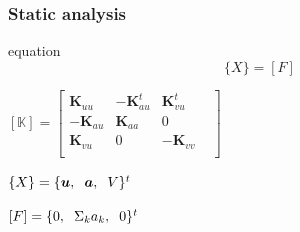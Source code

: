 \documentclass[compress]{beamer}
\begin{document}
\begin{frame}
\begin{columns}[totalwidth=\textwidth]
\begin{column}{.75\textwidth}
	\end{column}
\end{columns}	
\end{frame}

\begin{frame}\frametitle{Static analysis}
\begin{beamercolorbox}[center]{equation}
      \begin{equation*}
		[\mathbb{K}] \{ X \}=[F]
		\end{equation*}
\end{beamercolorbox}
\begin{itemize} [label=$\bullet$, font=\small, leftmargin=*]
\begin{minipage}{0.53\linewidth}
\item  $ 
[\mathbb{K}] = \begin{bmatrix}
       \boldsymbol{K}_{uu}  & -\boldsymbol{K}^t_{au} & \boldsymbol{K}^t_{vu}          \\[0.3em]
       -\boldsymbol{K}_{au} & \boldsymbol{K}_{aa}           & 0 \\[0.3em]
       \boldsymbol{K}_{vu}         & 0 & -\boldsymbol{K}_{vv} &  \\
     \end{bmatrix}
$
\end{minipage}
\begin{minipage}{0.4\linewidth}
\item $\{ X \} = \{\boldsymbol{u},\hspace{0.2cm} \boldsymbol{a},\hspace{0.2cm} V \}^t$
\item $[F] = \{0, \hspace{0.2cm} \Sigma_k a_k, \hspace{0.2cm} 0 \}^t$
\end{minipage}
\end{itemize}
\begin{columns}[totalwidth=\textwidth] 
   \begin{column}{.25\textwidth}

\end{column}
\end{columns}
\end{frame}
\end{document}
